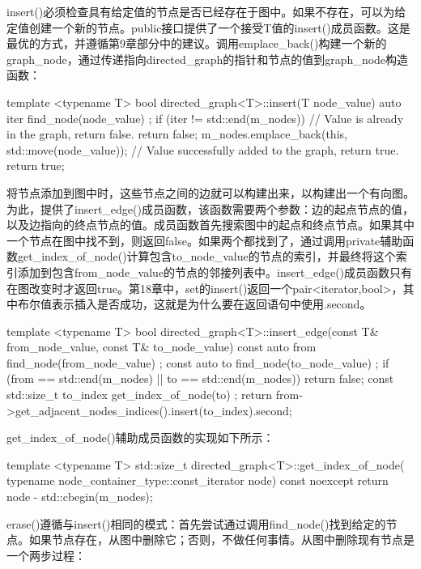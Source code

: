 insert()必须检查具有给定值的节点是否已经存在于图中。如果不存在，可以为给定值创建一个新的节点。public接口提供了一个接受T值的insert()成员函数。这是最优的方式，并遵循第9章部分中的建议。调用emplace\_back()构建一个新的graph\_node，通过传递指向directed\_graph的指针和节点的值到graph\_node构造函数：

\begin{cpp}
template <typename T>
bool directed_graph<T>::insert(T node_value)
{
    auto iter { find_node(node_value) };
    if (iter != std::end(m_nodes)) {
        // Value is already in the graph, return false.
        return false;
    }
    m_nodes.emplace_back(this, std::move(node_value));
    // Value successfully added to the graph, return true.
    return true;
}
\end{cpp}


将节点添加到图中时，这些节点之间的边就可以构建出来，以构建出一个有向图。为此，提供了insert\_edge()成员函数，该函数需要两个参数：边的起点节点的值，以及边指向的终点节点的值。成员函数首先搜索图中的起点和终点节点。如果其中一个节点在图中找不到，则返回false。如果两个都找到了，通过调用private辅助函数get\_index\_of\_node()计算包含to\_node\_value的节点的索引，并最终将这个索引添加到包含from\_node\_value的节点的邻接列表中。insert\_edge()成员函数只有在图改变时才返回true。第18章中，set的insert()返回一个pair<iterator,bool>，其中布尔值表示插入是否成功，这就是为什么要在返回语句中使用.second。

\begin{cpp}
template <typename T>
bool directed_graph<T>::insert_edge(const T& from_node_value,
    const T& to_node_value)
{
    const auto from { find_node(from_node_value) };
    const auto to { find_node(to_node_value) };
    if (from == std::end(m_nodes) || to == std::end(m_nodes)) {
        return false;
    }
    const std::size_t to_index { get_index_of_node(to) };
    return from->get_adjacent_nodes_indices().insert(to_index).second;
}
\end{cpp}

get\_index\_of\_node()辅助成员函数的实现如下所示：

\begin{cpp}
template <typename T>
std::size_t directed_graph<T>::get_index_of_node(
    typename node_container_type::const_iterator node) const noexcept
{
    return node - std::cbegin(m_nodes);
}
\end{cpp}


erase()遵循与insert()相同的模式：首先尝试通过调用find\_node()找到给定的节点。如果节点存在，从图中删除它；否则，不做任何事情。从图中删除现有节点是一个两步过程：


